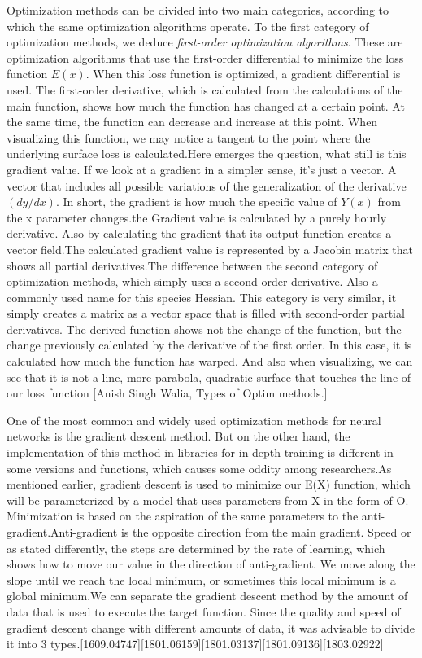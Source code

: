Optimization methods can be divided into two main categories, according to which the same optimization algorithms operate. To the first category of optimization methods, we deduce \textit{ first-order optimization algorithms}. These are optimization algorithms that use the first-order differential to minimize the loss function $E (x)$. When this loss function is optimized, a gradient differential is used. The first-order derivative, which is calculated from the calculations of the main function, shows how much the function has changed at a certain point. At the same time, the function can decrease and increase at this point. When visualizing this function, we may notice a tangent to the point where the underlying surface loss is calculated.Here emerges the question, what still is this gradient value. If we look at a gradient in a simpler sense, it's just a vector. A vector that includes all possible variations of the generalization of the derivative $(dy/dx)$. In short, the gradient is how much the specific value of $Y(x)$ from the x parameter changes.the Gradient value is calculated by a purely hourly derivative. Also by calculating the gradient that its output function creates a vector field.The calculated gradient value is represented by a Jacobin matrix that shows all partial derivatives.The difference between the second category of optimization methods, which simply uses a second-order derivative. Also a commonly used name for this species Hessian. This category is very similar, it simply creates a matrix as a vector space that is filled with second-order partial derivatives. The derived function shows not the change of the function, but the change previously calculated by the derivative of the first order. In this case, it is calculated how much the function has warped. And also when visualizing, we can see that it is not a line, more parabola, quadratic surface that touches the line of our loss function [Anish Singh Walia, Types of Optim methods.]


\par One of the most common and widely used optimization methods for neural networks is the gradient descent method. But on the other hand, the implementation of this method in libraries for in-depth training is different in some versions and functions, which causes some oddity among researchers.As mentioned earlier, gradient descent is used to minimize our E(X) function, which will be parameterized by a model that uses parameters from X in the form of O. Minimization is based on the aspiration of the same parameters to the anti-gradient.Anti-gradient is the opposite direction from the main gradient. Speed or as stated differently, the steps are determined by the rate of learning, which shows how to move our value in the direction of anti-gradient. We move along the slope until we reach the local minimum, or sometimes this local minimum is a global minimum.We can separate the gradient descent method by the amount of data that is used to execute the target function. Since the quality and speed of gradient descent change with different amounts of data, it was advisable to divide it into 3 types.[1609.04747][1801.06159][1801.03137][1801.09136][1803.02922]


